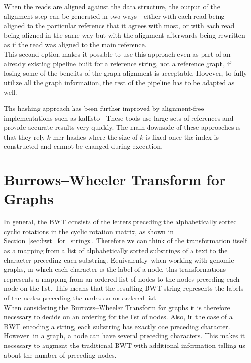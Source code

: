 \documentclass[a4paper,12pt,twoside,BCOR=10mm]{scrbook}
\begin{document}
When the reads are aligned against the data structure, the output of the alignment step
can be generated in two ways---either with each read being aligned to the particular reference
that it agrees with most, or with each read being aligned in the same way but with the
alignment afterwards being rewritten as if the read was aligned to the main reference. \\
This second option makes it possible to use this approach even as part of an already existing pipeline
built for a reference string, not a reference graph, if losing some of the benefits of
the graph alignment is acceptable. However, to fully utilize all the graph information,
the rest of the pipeline has to be adapted as well.

The hashing approach has been further improved by alignment-free implementations such as
kallisto \citep{Bray2015}.
These tools use large sets of references and provide accurate results very quickly.
The main downside of these approaches is that they rely $ k $-mer hashes
where the size of $ k $ is fixed once the index is constructed and cannot be changed during execution.

\section{Burrows--Wheeler Transform for Graphs}

In general, the BWT consists of the letters preceding the alphabetically sorted cyclic rotations
in the cyclic rotation matrix, as shown in Section~\ref{sec:bwt_for_strings}.
Therefore we can think of the transformation itself as a mapping from a list of alphabetically
sorted substrings of a text to the character preceding each substring.
Equivalently, when working with genomic graphs, in which each character is the label
of a node, this transformations represents a mapping from an ordered list of nodes
to the nodes preceding each node on the list.
This means that the resulting BWT string represents the labels of the nodes
preceding the nodes on an ordered list. \\
When considering the Burrows--Wheeler Transform for graphs it is therefore necessary
to decide on an ordering for the list of nodes.
Also, in the case of a BWT encoding a string, each substring has exactly one preceding character.
However, in a graph, a node can have several preceding characters.
This makes it necessary to augment the traditional BWT with additional information telling
us about the number of preceding nodes.
\end{document}
